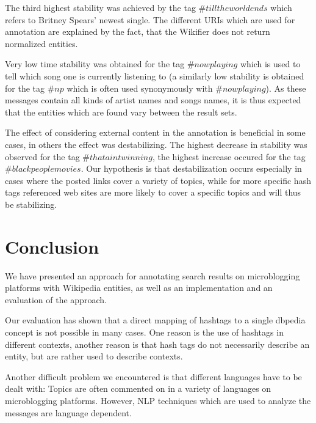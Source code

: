 \documentclass{llncs}
\begin{document}
The third highest stability was achieved by the tag $\#tilltheworldends$ which refers to Britney Spears' newest single. The different URIs which are used for annotation are explained by the fact, that the Wikifier does not return normalized entities.

Very low time stability was obtained for the tag $\#nowplaying$ which is used to tell which song one is currently listening to (a similarly low stability is obtained for the tag $\#np$ which is often used synonymously with $\#nowplaying$). As these messages contain all kinds of artist names and songs names, it is thus expected that the entities which are found vary between the result sets.

The effect of considering external content in the annotation is beneficial in some cases, in others the effect was destabilizing. The highest decrease in stability was observed for the tag $\#thataintwinning$, the highest increase occured for the tag $\#blackpeoplemovies$. Our hypothesis is that destabilization occurs especially in cases where the posted links cover a variety of topics, while for more specific hash tags referenced web sites are more likely to cover a specific topics and will thus be stabilizing.


\section{Conclusion}
\label{sect:conclusion}

We have presented an approach for annotating search results on microblogging platforms with Wikipedia entities, as well as an implementation and an evaluation of the approach.

Our evaluation has shown that a direct mapping of hashtags to a single dbpedia concept is not possible in many cases. One reason is the use of hashtags in different contexts, another reason is that hash tags do not necessarily describe an entity, but are rather used to describe contexts.

Another difficult problem we encountered is that different languages have to be dealt with: Topics are often commented on in a variety of languages on microblogging platforms. However, NLP techniques which are used to analyze the messages are language dependent.




\end{document}
